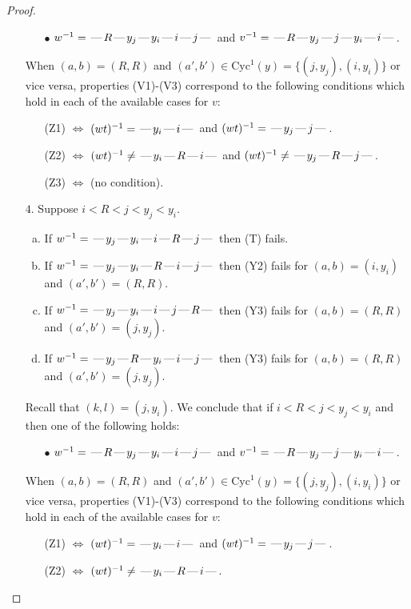 \documentclass[10pt]{article}
\theoremstyle{definition}
\theoremstyle{definition}
\def\dash{\text{\hspace{0.5mm}---\hspace{0.5mm}}}
\def\Cyc{\mathrm{Cyc}}
\begin{document}
\begin{proof}
\begin{enumerate}
\begin{enumerate}
\item[$\bullet$] $w^{-1} = \dash R\dash y_j\dash y_i\dash i\dash j\dash $ and $v^{-1} = \dash R\dash y_j\dash j\dash y_i\dash i\dash $.
\end{enumerate}
When $(a,b)= (R, R)$ and $(a',b')\in \Cyc^1(y)=\{(j,y_j),(i,y_i)\}$ or vice versa,
properties (V1)-(V3) correspond to the following conditions which hold in
each of the available cases for $v$:
\begin{enumerate}
\item[](Z1) $\Leftrightarrow$ $(wt)^{-1} = \dash y_i \dash i \dash$  and $(wt)^{-1} = \dash y_j \dash j \dash$.
\item[](Z2) $\Leftrightarrow$ $(wt)^{-1} \neq \dash y_i \dash R \dash i \dash$  and $(wt)^{-1} \neq \dash y_j \dash R \dash j \dash$.
\item[](Z3) $\Leftrightarrow$ (no condition).
\end{enumerate}
\item[$4$.] Suppose $i < R < j < y_j < y_i$.
\begin{enumerate}[(a)]
\item If $w^{-1} = \dash y_j\dash y_i\dash i\dash R\dash j\dash $ then (T) fails.
\item If $w^{-1} = \dash y_j\dash y_i\dash R\dash i\dash j\dash $ then (Y2) fails for $(a,b)=(i,y_i)$ and $(a',b')=(R,R)$.
\item If $w^{-1} = \dash y_j\dash y_i\dash i\dash j\dash R\dash $ then (Y3) fails for $(a,b)=(R,R)$ and $(a',b')=(j,y_j)$.
\item If $w^{-1} = \dash y_j\dash R\dash y_i\dash i\dash j\dash $ then (Y3) fails for $(a,b)=(R,R)$ and $(a',b')=(j,y_j)$.
\end{enumerate}
Recall that $(k,l) = (j,y_i)$.
We conclude that if $i < R < j < y_j < y_i$ and then one of the following holds:
\begin{enumerate}
\item[$\bullet$] $w^{-1} = \dash R\dash y_j\dash y_i\dash i\dash j\dash $ and $v^{-1} = \dash R\dash y_j\dash j\dash y_i\dash i\dash $.
\end{enumerate}
When $(a,b)= (R, R)$ and $(a',b')\in \Cyc^1(y)=\{(j,y_j),(i,y_i)\}$ or vice versa,
properties (V1)-(V3) correspond to the following conditions which hold in
each of the available cases for $v$:
\begin{enumerate}
\item[](Z1) $\Leftrightarrow$ $(wt)^{-1} = \dash y_i \dash i \dash$  and $(wt)^{-1} = \dash y_j \dash j \dash$.
\item[](Z2) $\Leftrightarrow$ $(wt)^{-1} \neq \dash y_i \dash R \dash i \dash$.

\end{enumerate}
\end{enumerate}
\end{proof}
\end{document}
